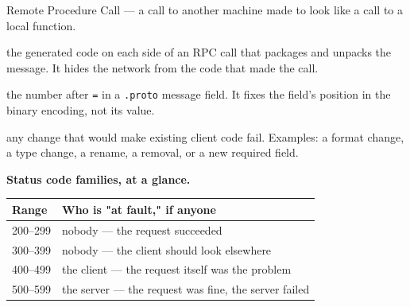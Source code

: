 \documentclass[a4paper,11pt]{article}
\begin{document}
\begin{description}[leftmargin=10em,style=nextline,font=\normalfont\bfseries\color{accent}]
  \item[RPC] Remote Procedure Call --- a call to another machine made to
        look like a call to a local function.
  \item[client stub / server stub] the generated code on each side of an
        RPC call that packages and unpacks the message. It hides the
        network from the code that made the call.
  \item[field tag] the number after \texttt{=} in a \texttt{.proto}
        message field. It fixes the field's position in the binary
        encoding, not its value.
  \item[breaking change] any change that would make existing client code
        fail. Examples: a format change, a type change, a rename, a
        removal, or a new required field.
\end{description}

\medskip
\noindent\textbf{Status code families, at a glance.}
\begin{center}\small
\begin{tabular}{@{}ll@{}}
\toprule \textbf{Range} & \textbf{Who is "at fault," if anyone} \\ \midrule
200--299 & nobody --- the request succeeded \\
300--399 & nobody --- the client should look elsewhere \\
400--499 & the client --- the request itself was the problem \\
500--599 & the server --- the request was fine, the server failed \\
\bottomrule
\end{tabular}
\end{center}
\end{document}
